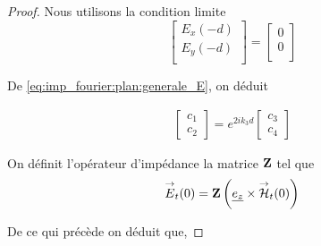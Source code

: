         \begin{proof}
            Nous utilisons la condition limite 
            \begin{equation}
                \begin{bmatrix}
                    E_x(-d)\\
                    E_y(-d)\\
                \end{bmatrix}
                =
                \begin{bmatrix}
                    0\\
                    0\\
                \end{bmatrix}
            \end{equation}

            De \eqref{eq:imp_fourier:plan:generale_E}, on déduit

            \begin{align}
                \begin{bmatrix}
                    c_1 \\
                    c_2
                \end{bmatrix}
                = e^{2ik_3 d}
                \begin{bmatrix}
                    c_3 \\
                    c_4
                \end{bmatrix}
            \end{align}

            On définit l'opérateur d'impédance la matrice $\mathbf{Z}$ tel que 
            \begin{equation}
                {\overset{\rightarrow}{E}}_t(0) = \mathbf{Z} \left(\underline{e_z} \times {\overset{\rightarrow}{\mathcal{H}}}_t(0)\right)
            \end{equation}

            De ce qui précède on déduit que,


\end{proof}
